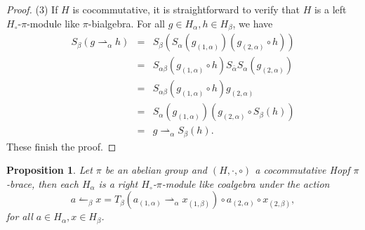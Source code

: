 \documentclass[11pt]{article}
\def\a{\alpha}
\def\b{\beta}
\newtheorem{proposition}[theorem]{Proposition}
\begin{document}
\begin{proof}
(3) If $H$ is cocommutative, it is straightforward to verify that $H$ is a left $H_{\circ}$-$\pi$-module like $\pi$-bialgebra.
For all $g\in H_\a, h\in H_\b$, we have
\begin{eqnarray*}
S_\b(g\rightharpoonup_\a h) &=& S_\b(S_\a(g_{(1,\a)})(g_{(2,\a)}\circ h)) \\
 &=& S_{\a\b}(g_{(1,\a)}\circ h)S_{\bar{\a}}S_\a(g_{(2,\a)})\\
 &=& S_{\a\b}(g_{(1,\a)}\circ h)g_{(2,\a)} \\
 &=& S_\a(g_{(1,\a)})(g_{(2,\a)}\circ S_\b(h)) \\
 &=& g\rightharpoonup_{\a} S_\b(h). 
\end{eqnarray*}
These finish the proof.
\end{proof}

\begin{proposition}
Let $\pi$ be an abelian group and $(H,\cdot,\circ)$ a cocommutative Hopf $\pi$-brace, then each $H_\a$ is a right $H_\circ$-$\pi$-module like coalgebra under the action
$$a\leftharpoonup_\b x=T_\b(a_{(1,\a)}\rightharpoonup_\a x_{(1,\b)})\circ a_{(2,\a)}\circ x_{(2,\b)},$$
for all $a\in H_\a,x\in H_\b$.
\end{proposition}
\end{document}
